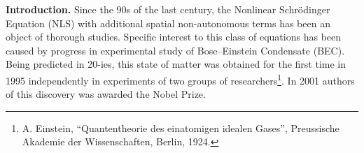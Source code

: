 \documentclass[candidate, href, colorlinks]{disser}
\begin{document}
%	
%	
%
%
%
%
%
%


\textbf{Introduction.}
Since the 90s of the last century, the Nonlinear Schr\"odinger Equation (NLS) with additional spatial non-autonomous terms has been an object of thorough studies.
Specific interest to this class of equations has been caused by progress in experimental study of Bose--Einstein Condensate (BEC).
Being predicted in 20-ies, this state of matter was obtained for the first time in 1995 independently in experiments of two groups of researchers\footnote{A. Einstein, ``Quantentheorie des einatomigen idealen Gases'', Preussische Akademie der Wissenschaften, Berlin, 1924.}.
In 2001 authors of this discovery was awarded the Nobel Prize.
\end{document}
